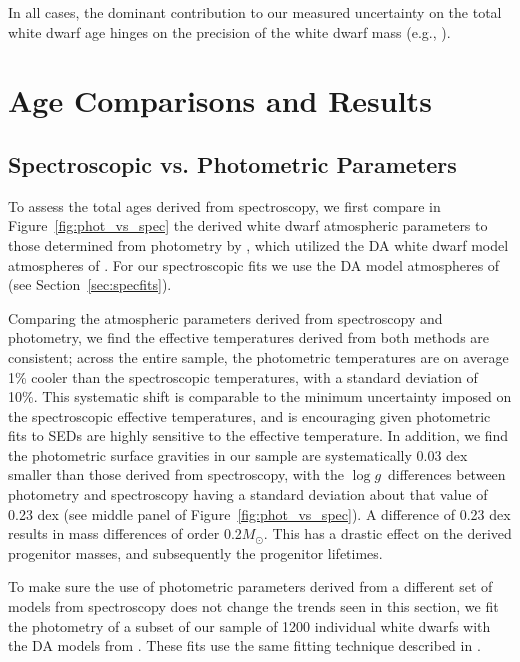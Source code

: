 \documentclass[twocolumn]{aastex631}
\newcommand{\msun}{$M_{\odot}$}
\newcommand{\logg}{$\log{g}$}
\begin{document}
In all cases, the dominant contribution to our measured uncertainty on the total white dwarf age hinges on the precision of the white dwarf mass (e.g., \citealt{2004ApJS..155..551H,2012Natur.486...90K}).

\section{Age Comparisons and Results}\label{sec:comparisons}

\subsection{Spectroscopic vs. Photometric Parameters}\label{sec:spec_vs_phot}
To assess the total ages derived from spectroscopy, we first compare in Figure~\ref{fig:phot_vs_spec} the derived white dwarf atmospheric parameters to those determined from photometry by \cite{2022ApJ...934..148H}, which utilized the DA white dwarf model atmospheres of \cite{2010MmSAI..81..921K}. For our spectroscopic fits we use the DA model atmospheres of \cite{2011ApJ...730..128T} (see Section~\ref{sec:specfits}). 

Comparing the atmospheric parameters derived from spectroscopy and photometry, we find the effective temperatures derived from both methods are consistent; across the entire sample, the photometric temperatures are on average 1\% cooler than the spectroscopic temperatures, with a standard deviation of 10\%. This systematic shift is comparable to the minimum uncertainty imposed on the spectroscopic effective temperatures, and is encouraging given photometric fits to SEDs are highly sensitive to the effective temperature. In addition, we find the photometric surface gravities in our sample are systematically 0.03 dex smaller than those derived from spectroscopy, with the \logg\ differences between photometry and spectroscopy having a standard deviation about that value of 0.23 dex (see middle panel of Figure~\ref{fig:phot_vs_spec}). A difference of 0.23 dex results in mass differences of order 0.2\msun. This has a drastic effect on the derived progenitor masses, and subsequently the progenitor lifetimes.

To make sure the use of photometric parameters derived from a different set of models from spectroscopy does not change the trends seen in this section, we fit the photometry of a subset of our sample of 1200 individual white dwarfs with the DA models from \cite{2011ApJ...730..128T}. These fits use the same fitting technique described in \cite{2022ApJ...934..148H}. 
\end{document}
